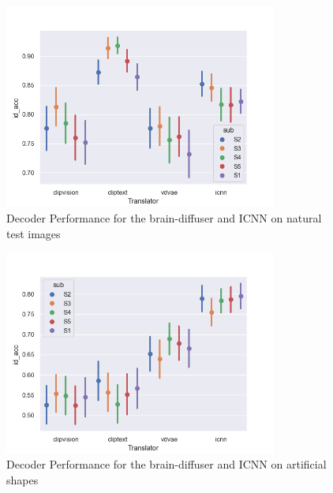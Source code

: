\begin{figure}[ht]
    \centering
    \includegraphics[width=0.8\textwidth]{plots/baseline_translator_test.png}
    \caption{Decoder Performance for the brain-diffuser and ICNN on natural test images}\label{fig:baselinetranslatortest}
\end{figure}

\begin{figure}[ht]
    \centering
    \includegraphics[width=0.8\textwidth]{plots/baseline_translator_art.png}
    \caption{Decoder Performance for the brain-diffuser and ICNN on artificial shapes}\label{fig:baselinetranslatorart}
\end{figure}

% 


